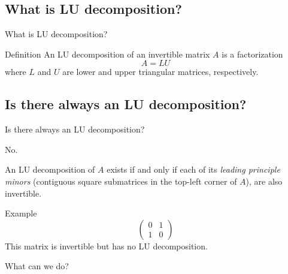\documentclass{beamer}
\begin{document}
\subsection{What is LU decomposition?}

\begin{frame}{What is LU decomposition?}
    \begin{block}{Definition}
        An LU decomposition of an invertible matrix $A$ is a factorization
        \[
            A = L U
        \]
        where $L$ and $U$ are lower and upper triangular matrices, respectively.
    \end{block}
\end{frame}

\subsection{Is there always an LU decomposition?}

\begin{frame}{Is there always an LU decomposition?}

    \alert{No.}

    An LU decomposition of $A$ exists if and only if each of its \emph{leading principle minors}
    (contiguous square submatrices in the top-left corner of $A$),
    are also invertible.

    \begin{exampleblock}{Example}
        \[
            \begin{pmatrix}{}
                0 & 1 \\
                1 & 0
            \end{pmatrix}
        \]
        This matrix is invertible but has no LU decomposition.
    \end{exampleblock}

    \begin{alertblock}{}
        What can we do?
    \end{alertblock}


\end{frame}
\end{document}
